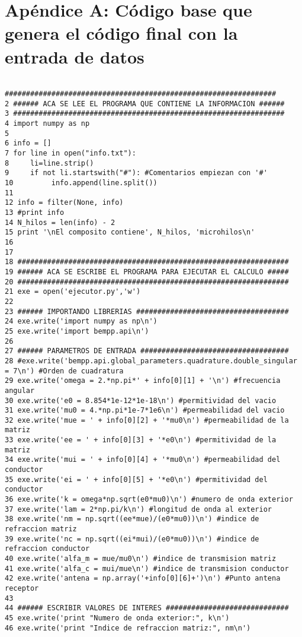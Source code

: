 \documentclass[12pt,letterpaper]{report}
\numberwithin{equation}{section}
\begin{document}
\part*{Apéndice A: Código base que genera el código final con la entrada de datos}

\begin{lstlisting}

################################################################
2 ###### ACA SE LEE EL PROGRAMA QUE CONTIENE LA INFORMACION ######
3 ################################################################
4 import numpy as np
5 
6 info = []
7 for line in open("info.txt"):
8     li=line.strip()
9     if not li.startswith("#"): #Comentarios empiezan con '#'
10         info.append(line.split())
11 
12 info = filter(None, info)
13 #print info
14 N_hilos = len(info) - 2
15 print '\nEl composito contiene', N_hilos, 'microhilos\n'
16 
17 
18 ################################################################
19 ###### ACA SE ESCRIBE EL PROGRAMA PARA EJECUTAR EL CALCULO #####
20 ################################################################
21 exe = open('ejecutor.py','w')
22 
23 ###### IMPORTANDO LIBRERIAS ####################################
24 exe.write('import numpy as np\n')
25 exe.write('import bempp.api\n')
26 
27 ###### PARAMETROS DE ENTRADA ###################################
28 #exe.write('bempp.api.global_parameters.quadrature.double_singular = 7\n') #Orden de cuadratura
29 exe.write('omega = 2.*np.pi*' + info[0][1] + '\n') #frecuencia angular
30 exe.write('e0 = 8.854*1e-12*1e-18\n') #permitividad del vacio
31 exe.write('mu0 = 4.*np.pi*1e-7*1e6\n') #permeabilidad del vacio
32 exe.write('mue = ' + info[0][2] + '*mu0\n') #permeabilidad de la matriz
33 exe.write('ee = ' + info[0][3] + '*e0\n') #permitividad de la matriz
34 exe.write('mui = ' + info[0][4] + '*mu0\n') #permeabilidad del conductor
35 exe.write('ei = ' + info[0][5] + '*e0\n') #permitividad del conductor
36 exe.write('k = omega*np.sqrt(e0*mu0)\n') #numero de onda exterior
37 exe.write('lam = 2*np.pi/k\n') #longitud de onda al exterior
38 exe.write('nm = np.sqrt((ee*mue)/(e0*mu0))\n') #indice de refraccion matriz
39 exe.write('nc = np.sqrt((ei*mui)/(e0*mu0))\n') #indice de refraccion conductor
40 exe.write('alfa_m = mue/mu0\n') #indice de transmision matriz
41 exe.write('alfa_c = mui/mue\n') #indice de transmision conductor
42 exe.write('antena = np.array('+info[0][6]+')\n') #Punto antena receptor
43 
44 ###### ESCRIBIR VALORES DE INTERES #############################
45 exe.write('print "Numero de onda exterior:", k\n')
46 exe.write('print "Indice de refraccion matriz:", nm\n')

\end{lstlisting}
\end{document}
